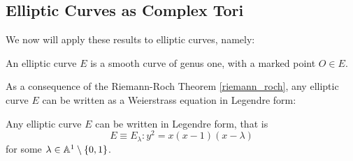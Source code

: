 

\subsection{Elliptic Curves as Complex Tori}

We now will apply these results to elliptic curves, namely:\\

\begin{defn}
	An elliptic curve $E$ is a smooth curve of genus one, with a marked point $O \in E$.
\end{defn}

As a consequence of the Riemann-Roch Theorem \ref{riemann_roch}, any elliptic curve $E$ can be written as a Weierstrass equation in Legendre form:\\

\begin{theorem}
	Any elliptic curve $E$ can be written in Legendre form, that is
	\begin{equation}
		\label{legendre}
		E \equiv E_{\lambda}: y^{2} = x(x-1)(x-\lambda)
	\end{equation}
	for some $\lambda \in \mathbb{A}^{1}\setminus\{0,1\}$.
\end{theorem}

